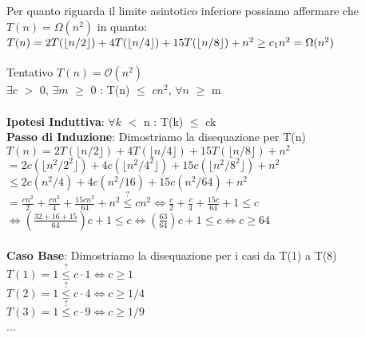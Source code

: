 \documentclass[../cheatSheetAlgoritmi.tex]{subfiles}
\begin{document}
Per quanto riguarda il limite asintotico inferiore possiamo affermare che $T(n) = \Omega(n^{2})$ in quanto:\\
$T(n) = 2T(\lfloor n/2 \rfloor) + 4T(\lfloor n/4 \rfloor) + 15T(\lfloor n/8 \rfloor) + n^{2} \geq c\textsubscript{1}n^{2} = \Omega(n^{2})$\\\\
Tentativo $T(n) = \mathcal{O}(n^{2})$\\
$\exists c$ $>$ 0, $\exists m$ $\geq$ 0 : T(n) $\leq$ $cn^{2}$, $\forall n$ $\geq$ m\\\\
\textbf{Ipotesi Induttiva}: $\forall k$ $<$ n : T(k) $\leq$ ck\\
\textbf{Passo di Induzione}: Dimostriamo la disequazione per T(n)\\
$T(n) = 2T(\lfloor n/2 \rfloor) + 4T(\lfloor n/4 \rfloor) + 15T(\lfloor n/8 \rfloor) + n^{2}$\\
$= 2c(\lfloor n^{2}/2^{2} \rfloor) + 4c(\lfloor n^{2}/4^{2} \rfloor) + 15c(\lfloor n^{2}/8^{2} \rfloor) + n^{2}$\\
$\leq 2c(n^{2}/4) + 4c(n^{2}/16) + 15c(n^{2}/64) + n^{2}$\\
$= \frac{cn^{2}}{2} + \frac{cn^{2}}{4} + \frac{15cn^{2}}{64} + n^{2}  \stackrel{?}{\leq} cn^{2} \iff \frac{c}{2} + \frac{c}{4} + \frac{15c}{64} + 1  \leq c$\\
$\iff (\frac{32 + 16 + 15}{64})c + 1 \leq c \iff (\frac{63}{64})c + 1 \leq c \iff c \geq 64$\\\\
\textbf{Caso Base}: Dimostriamo la disequazione per i casi da T(1) a T(8)\\
$T(1) = 1 \stackrel{?}{\leq} c \cdot 1 \iff c \geq 1$\\
$T(2) = 1 \stackrel{?}{\leq} c \cdot 4 \iff c \geq 1/4$\\
$T(3) = 1 \stackrel{?}{\leq} c \cdot 9 \iff c \geq 1/9$\\
...\\
\end{document}
